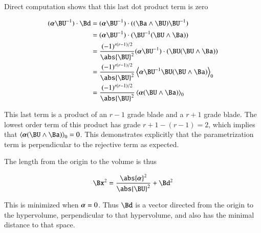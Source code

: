 Direct computation shows that this last dot product term is zero

\begin{align*}
(\Balpha \BU^{-1}) \cdot \Bd
&= (\Balpha \BU^{-1}) \cdot ((\Ba \wedge \BU){\BU}^{-1}) \\
&= (\Balpha \BU^{-1}) \cdot ( {\BU}^{-1} (\BU \wedge \Ba)) \\
&= \frac{(-1)^{r(r-1)/2}}{\abs{\BU}^2} (\Balpha \BU^{-1}) \cdot ( \BU (\BU \wedge \Ba)) \\
&= \frac{(-1)^{r(r-1)/2}}{\abs{\BU}^2} \left<\Balpha \BU^{-1} \BU (\BU \wedge \Ba)\right>_0 \\
&= \frac{(-1)^{r(r-1)/2}}{\abs{\BU}^2} \left<\Balpha (\BU \wedge \Ba)\right>_0 \\
\end{align*}

This last term is a product of an $r-1$ grade blade and a $r+1$ grade blade.  The lowest order term of this product has grade $r+1 -(r-1) = 2$, which
implies that
$\left<\Balpha (\BU \wedge \Ba)\right>_0 = 0$.  This demonstrates explicitly that the parametrization term is perpendicular to the rejective term as expected.

The length from the origin to the volume is thus

\begin{align*}
{\Bx}^2 &= \frac{\abs{\Balpha}^2}{{\abs{\BU}^2}} + \Bd^2 \\
\end{align*}

This is minimized when $\boldsymbol{\alpha} = 0$.  Thus $\Bd$ is a vector directed from the origin to the hypervolume, perpendicular to that hypervolume, and also has the minimal distance to that space.

